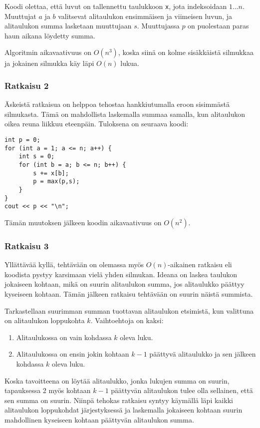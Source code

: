 Koodi olettaa, että luvut on tallennettu taulukkoon \texttt{x},
jota indeksoidaan $1 \ldots n$.
Muuttujat $a$ ja $b$ valitsevat alitaulukon ensimmäisen
ja viimeisen luvun, ja alitaulukon summa lasketaan muuttujaan $s$.
Muuttujassa $p$ on puolestaan paras haun aikana löydetty summa.

Algoritmin aikavaativuus on $O(n^3)$, koska siinä on kolme
sisäkkäistä silmukkaa ja jokainen silmukka käy läpi $O(n)$ lukua.

\subsubsection{Ratkaisu 2}

Äskeistä ratkaisua on helppoa tehostaa hankkiutumalla
eroon sisimmästä silmukasta.
Tämä on mahdollista laskemalla summaa samalla,
kun alitaulukon oikea reuna liikkuu eteenpäin.
Tuloksena on seuraava koodi:

\begin{lstlisting}
int p = 0;
for (int a = 1; a <= n; a++) {
    int s = 0;
    for (int b = a; b <= n; b++) {
        s += x[b];
        p = max(p,s);
    }
}
cout << p << "\n";
\end{lstlisting}
Tämän muutoksen jälkeen koodin aikavaativuus on $O(n^2)$.

\subsubsection{Ratkaisu 3}

Yllättävää kyllä, tehtävään on olemassa myös
$O(n)$-aikainen ratkaisu eli koodista pystyy
karsimaan vielä yhden silmukan.
Ideana on laskea taulukon jokaiseen
kohtaan, mikä on suurin alitaulukon
summa, jos alitaulukko päättyy kyseiseen kohtaan.
Tämän jälkeen ratkaisu tehtävään on suurin
näistä summista.

Tarkastellaan suurimman summan tuottavan
alitaulukon etsimistä,
kun valittuna on alitaulukon loppukohta $k$.
Vaihtoehtoja on kaksi:
\begin{enumerate}
\item Alitaulukossa on vain kohdassa $k$ oleva luku.
\item Alitaulukossa on ensin jokin kohtaan $k-1$ päättyvä alitaulukko
ja sen jälkeen kohdassa $k$ oleva luku.
\end{enumerate}

Koska tavoitteena on löytää alitaulukko,
jonka lukujen summa on suurin,
tapauksessa 2 myös kohtaan $k-1$ päättyvän
alitaulukon tulee olla sellainen,
että sen summa on suurin.
Niinpä tehokas ratkaisu syntyy käymällä läpi
kaikki alitaulukon loppukohdat järjestyksessä
ja laskemalla jokaiseen kohtaan suurin
mahdollinen kyseiseen kohtaan päättyvän alitaulukon summa.

